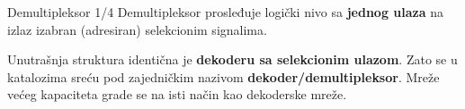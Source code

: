 \begin{frame}[t,label=03-s012]{Demultipleksor 1/4}
Demultipleksor prosleđuje logički nivo sa \textbf{jednog ulaza} na izlaz
izabran (adresiran) selekcionim signalima.
\par\vspace{1mm}
\begin{center}

\end{center}
\par\vspace{1mm}
Unutrašnja struktura identična je \textbf{dekoderu sa selekcionim ulazom}.
Zato se u katalozima sreću pod zajedničkim nazivom \textbf{dekoder/demultipleksor}.
Mreže većeg kapaciteta grade se na isti način kao dekoderske mreže.
\end{frame}

